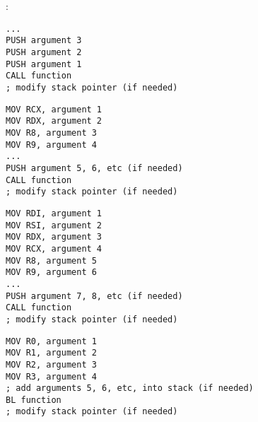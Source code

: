 \chapter{\PrintfSeveralArgumentsSectionName}





\ifdefined\IncludeARM

\fi
\ifdefined\IncludeMIPS

\fi

\section{\Conclusion{}}

:

\begin{lstlisting}[caption=x86]
...
PUSH argument 3
PUSH argument 2
PUSH argument 1
CALL function
; modify stack pointer (if needed)
\end{lstlisting}

\begin{lstlisting}[caption=x64 (MSVC)]
MOV RCX, argument 1
MOV RDX, argument 2
MOV R8, argument 3
MOV R9, argument 4
...
PUSH argument 5, 6, etc (if needed)
CALL function
; modify stack pointer (if needed)
\end{lstlisting}

\begin{lstlisting}[caption=x64 (GCC)]
MOV RDI, argument 1
MOV RSI, argument 2
MOV RDX, argument 3
MOV RCX, argument 4
MOV R8, argument 5
MOV R9, argument 6
...
PUSH argument 7, 8, etc (if needed)
CALL function
; modify stack pointer (if needed)
\end{lstlisting}

\ifdefined\IncludeARM
\begin{lstlisting}[caption=ARM]
MOV R0, argument 1
MOV R1, argument 2
MOV R2, argument 3
MOV R3, argument 4
; add arguments 5, 6, etc, into stack (if needed)
BL function
; modify stack pointer (if needed)
\end{lstlisting}

